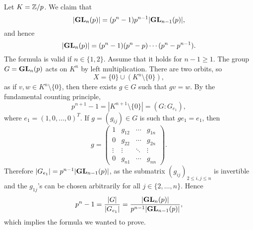 \begin{example}
Let $K=\mathbb{Z}/p$.
We claim that 
\[
|\mathbf{GL}_n(p)|=(p^n-1)p^{n-1}|\mathbf{GL}_{n-1}(p)|,
\]
and hence 
\[
|\mathbf{GL}_n(p)|=(p^n-1)(p^n-p)\cdots (p^n-p^{n-1}).
\]
The formula is valid if $n\in\{1,2\}$. 
Assume that it holds for $n-1\geq1$.
The group $G=\mathbf{GL}_{n}(p)$ acts on
$K^{n}$ by left multiplication. There are two orbits, so 
\[
X=\{0\}\cup (K^{n}\setminus\{0\}),
\]
as if $v,w\in K^{n}\setminus\{0\}$, then there exists 
$g\in G$ such that $gv=w$.
By the fundamental counting principle,  
\[
p^{n+1}-1=|K^{n+1}\setminus\{0\}|=(G:G_{e_1}),
\]
where $e_1=(1,0,\dots,0)^T$. If $g=(g_{ij})\in G$ is such that
$ge_1=e_1$, then 
\[
g=
\begin{pmatrix}
1 & g_{12} & \cdots & g_{1n}\\
0 & g_{22} & \cdots & g_{2n}\\
\vdots & \vdots & \ddots &\vdots\\
0 & g_{n1} & \cdots & g_{nn}
\end{pmatrix}.
\]
Therefore $|G_{e_1}|=p^{n-1}|\mathbf{GL}_{n-1}(p)|$, as the submatrix 
$(g_{ij})_{2\leq i,j\leq n}$ is invertible and the 
$g_{1j}$'s can be chosen 
arbitrarily for all $j\in\{2,\dots,n\}$.
Hence 
\[
p^{n}-1=\frac{|G|}{|G_{e_1}|}=\frac{|\mathbf{GL}_n(p)|}{p^{n-1}|\mathbf{GL}_{n-1}(p)|},
\]
which implies the formula we wanted to prove.
\end{example}


